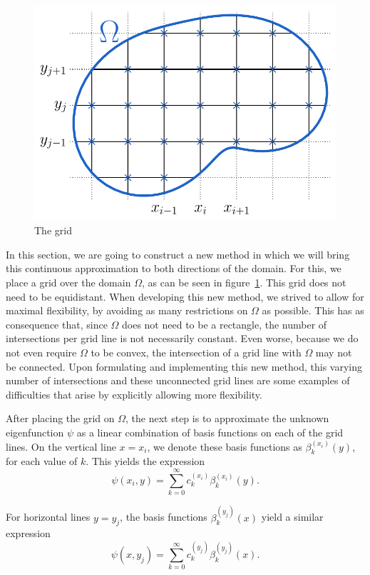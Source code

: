 \begin{figure}
    \begin{center}
        \includegraphics[width=.66\linewidth]{img/chapter4/the_method_grid.pdf}
        \caption{\label{fig:woven_method_grid} The grid}
    \end{center}
\end{figure}

In this section, we are going to construct a new method in which we will bring this continuous approximation to both directions of the domain. For this, we place a grid over the domain $\Omega$, as can be seen in figure~\ref{fig:woven_method_grid}. This grid does not need to be equidistant. When developing this new method, we strived to allow for maximal flexibility, by avoiding as many restrictions on $\Omega$ as possible. This has as consequence that, since $\Omega$ does not need to be a rectangle, the number of intersections per grid line is not necessarily constant. Even worse, because we do not even require $\Omega$ to be convex, the intersection of a grid line with $\Omega$ may not be connected. Upon formulating and implementing this new method, this varying number of intersections and these unconnected grid lines are some examples of difficulties that arise by explicitly allowing more flexibility.

After placing the grid on $\Omega$, the next step is to approximate the unknown eigenfunction $\psi$ as a linear combination of basis functions on each of the grid lines. On the vertical line $x = x_i$, we denote these basis functions as $\beta_k^{(x_i)}(y)$, for each value of $k$. This yields the expression
\begin{equation}\label{equ:c4_expression_on_lines_x}
    \psi(x_i, y) = \sum_{k=0}^\infty c_k^{(x_i)} \beta_k^{(x_i)}(y) \text{.}
\end{equation}

For horizontal lines $y = y_j$, the basis functions $\beta_k^{(y_j)}(x)$ yield a similar expression
\begin{equation}\label{equ:c4_expression_on_lines_y}
    \psi(x, y_j) = \sum_{k=0}^\infty c_k^{(y_j)} \beta_k^{(y_j)}(x) \text{.}
\end{equation}

